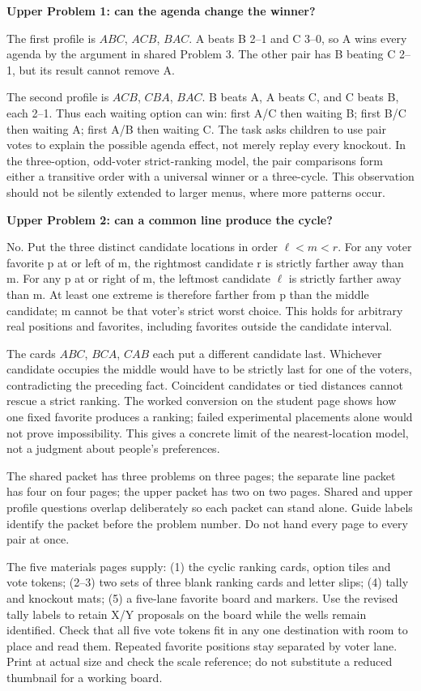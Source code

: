 \documentclass[11pt,letterpaper]{article}
\newcommand{\heading}[1]{\par\vspace{4pt}{\large\bfseries #1}\par}
\newcommand{\sub}[1]{\par\textbf{#1}\par}
\begin{document}
\sub{Upper Problem 1: can the agenda change the winner?}
The first profile is $ABC$, $ACB$, $BAC$. A beats B 2--1 and C 3--0, so A wins every agenda by the argument in shared Problem 3. The other pair has B beating C 2--1, but its result cannot remove A.

The second profile is $ACB$, $CBA$, $BAC$. B beats A, A beats C, and C beats B, each 2--1. Thus each waiting option can win: first A/C then waiting B; first B/C then waiting A; first A/B then waiting C. The task asks children to use pair votes to explain the possible agenda effect, not merely replay every knockout. In the three-option, odd-voter strict-ranking model, the pair comparisons form either a transitive order with a universal winner or a three-cycle. This observation should not be silently extended to larger menus, where more patterns occur.

\sub{Upper Problem 2: can a common line produce the cycle?}
No. Put the three distinct candidate locations in order $\ell<m<r$. For any voter favorite p at or left of m, the rightmost candidate r is strictly farther away than m. For any p at or right of m, the leftmost candidate $\ell$ is strictly farther away than m. At least one extreme is therefore farther from p than the middle candidate; m cannot be that voter's strict worst choice. This holds for arbitrary real positions and favorites, including favorites outside the candidate interval.

The cards $ABC$, $BCA$, $CAB$ each put a different candidate last. Whichever candidate occupies the middle would have to be strictly last for one of the voters, contradicting the preceding fact. Coincident candidates or tied distances cannot rescue a strict ranking. The worked conversion on the student page shows how one fixed favorite produces a ranking; failed experimental placements alone would not prove impossibility. This gives a concrete limit of the nearest-location model, not a judgment about people's preferences.
\newpage
\heading{Print map, provenance and use record}
The shared packet has three problems on three pages; the separate line packet has four on four pages; the upper packet has two on two pages. Shared and upper profile questions overlap deliberately so each packet can stand alone. Guide labels identify the packet before the problem number. Do not hand every page to every pair at once.

The five materials pages supply: (1) the cyclic ranking cards, option tiles and vote tokens; (2--3) two sets of three blank ranking cards and letter slips; (4) tally and knockout mats; (5) a five-lane favorite board and markers. Use the revised tally labels to retain X/Y proposals on the board while the wells remain identified. Check that all five vote tokens fit in any one destination with room to place and read them. Repeated favorite positions stay separated by voter lane. Print at actual size and check the scale reference; do not substitute a reduced thumbnail for a working board.
\end{document}
